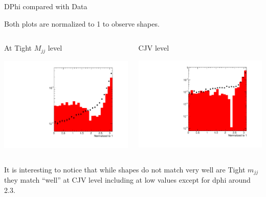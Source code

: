 \documentclass[8pt]{beamer}
\begin{document}
\begin{frame}{DPhi compared with Data}
 
Both plots are normalized to 1 to observe shapes.
 
\begin{columns}
 
\begin{block}{At Tight $M_{jj}$ level}
 
\includegraphics[width=\linewidth]{img/DataVsQCDVBF_TightMjj_dphijj}
 
\end{block}
 
\begin{block}{CJV level}

\includegraphics[width=\linewidth]{img/DataVsQCDVBF_CJVpass_dphijj}
 
\end{block}

\end{columns}

It is interesting to notice that while shapes do not match very well are Tight $m_{jj}$ they match ``well'' at CJV level including at low values except for dphi around 2.3.

\end{frame}
\end{document}
